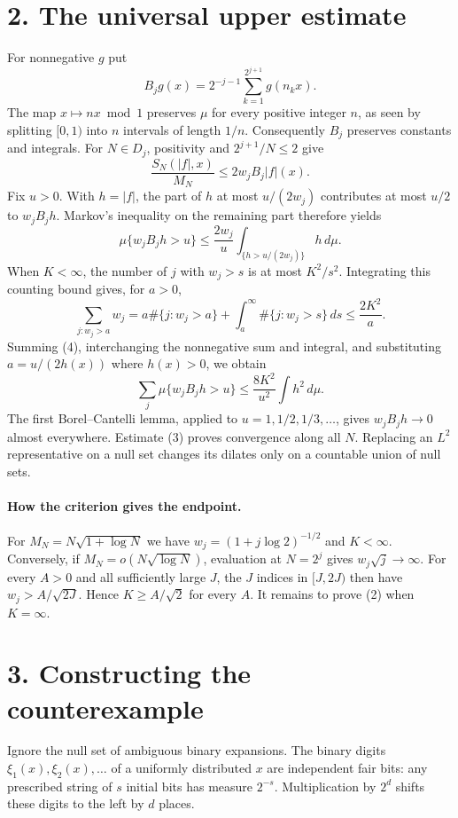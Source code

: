 \documentclass[11pt]{article}
\newcommand{\1}{\mathbf 1}
\newcommand{\card}{\#}
\begin{document}
\newpage
\section*{2. The universal upper estimate}
For nonnegative $g$ put
\[
 B_jg(x)=2^{-j-1}\sum_{k=1}^{2^{j+1}}g(n_kx).
\]
The map $x\mapsto nx\bmod 1$ preserves $\mu$ for every positive integer $n$,
as seen by splitting $[0,1)$ into $n$ intervals of length $1/n$.
Consequently $B_j$ preserves constants and integrals. For $N\in D_j$,
positivity and $2^{j+1}/N\le 2$ give
\[
                  \frac{S_N(|f|,x)}{M_N}\le2w_jB_j|f|(x).             \tag{3}
\]
Fix $u>0$. With $h=|f|$, the part of $h$ at most $u/(2w_j)$ contributes
at most $u/2$ to $w_j B_jh$. Markov's inequality on the remaining part
therefore yields
\[
       \mu\{w_jB_jh>u\}\le\frac{2w_j}{u}
                    \int_{\{h>u/(2w_j)\}}h\,d\mu.                    \tag{4}
\]
When $K<\infty$, the number of $j$ with $w_j>s$ is at most $K^2/s^2$.
Integrating this counting bound gives, for $a>0$,
\[
 \sum_{j:w_j>a} w_j
 =a\card\{j:w_j>a\}+\int_a^\infty\card\{j:w_j>s\}\,ds
 \le\frac{2K^2}{a}.
\]
Summing (4), interchanging the nonnegative sum and integral, and
substituting $a=u/(2h(x))$ where $h(x)>0$, we obtain
\[
             \sum_j\mu\{w_jB_jh>u\}\le \frac{8K^2}{u^2}\int h^2\,d\mu .
\]
The first Borel--Cantelli lemma, applied to $u=1,1/2,1/3,\ldots$,
gives $w_jB_jh\to0$ almost everywhere. Estimate (3) proves convergence
along all $N$. Replacing an $L^2$ representative on a null set changes
its dilates only on a countable union of null sets.

\paragraph{How the criterion gives the endpoint.}
For $M_N=N\sqrt{1+\log N}$ we have $w_j=(1+j\log2)^{-1/2}$ and $K<\infty$.
Conversely, if $M_N=o(N\sqrt{\log N})$, evaluation at $N=2^j$ gives
$w_j\sqrt j\to\infty$. For every $A>0$ and all sufficiently large $J$,
the $J$ indices in $[J,2J)$ then have $w_j>A/\sqrt{2J}$. Hence
$K\ge A/\sqrt2$ for every $A$. It remains to prove (2) when $K=\infty$.

\newpage
\section*{3. Constructing the counterexample}
Ignore the null set of ambiguous binary expansions. The binary digits
$\xi_1(x),\xi_2(x),\ldots$ of a uniformly distributed $x$ are independent
fair bits: any prescribed string of $s$ initial bits has measure $2^{-s}$.
Multiplication by $2^d$ shifts these digits to the left by $d$ places.
\end{document}
